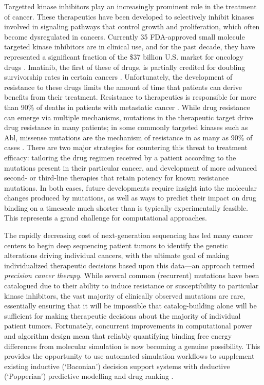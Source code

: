 Targetted kinase inhibitors play an increasingly prominent role in the treatment of cancer.
These therapeutics have been developed to selectively inhibit kinases involved in signaling pathways that control growth and proliferation, which often become dysregulated in cancers.
Currently 35 FDA-approved small molecule targeted kinase inhibitors are in clinical use, and for the past decade, they have represented a significant fraction of the \$37 billion U.S. market for oncology drugs \cite{FDA, Zhao2014}.
Imatinib, the first of these of drugs, is partially credited for doubling survivorship rates in certain cancers \cite{Zhao2014, ACSreport}.
Unfortunately, the development of resistance to these drugs limits the amount of time that patients can derive benefits from their treatment. 
Resistance to therapeutics is responsible for more than 90\% of deaths in patients with metastatic cancer \cite{Longley2005}. 
While drug resistance can emerge via multiple mechanisms, mutations in the therapeutic target drive drug resistance in many patients; in some commonly targeted kinases such as Abl, missense mutations are the mechanism of resistance in as many as 90\% of cases \cite{Shah2002}.
There are two major strategies for countering this threat to treatment efficacy: tailoring the drug regimen received by a patient according to the mutations present in their particular cancer, and development of more advanced second- or third-line therapies that retain potency for known resistance mutations.
In both cases, future developments require insight into the molecular changes produced by mutations, as well as ways to predict their impact on drug binding on a timescale much shorter than is typically experimentally feasible.
This represents a grand challenge for computational approaches.

The rapidly decreasing cost of next-generation sequencing has led many cancer centers to begin deep sequencing patient tumors to identify the genetic alterations driving individual cancers, with the ultimate goal of making individualized therapeutic decisions based upon this data—an approach termed \textit{precision cancer therapy}.
While several common (recurrent) mutations have been catalogued due to their ability to induce resistance or susceptibility to particular kinase inhibitors, the vast majority of clinically observed mutations are rare, essentially ensuring that it will be impossible that catalog-building alone will be sufficient for making therapeutic decisions about the majority of individual patient tumors.
Fortunately, concurrent improvements in computational power and algorithm design mean that reliably quantifying binding free energy differences from molecular simulation is now becoming a genuine possibility.
This provides the opportunity to use automated simulation workflows to supplement existing inductive (‘Baconian’) decision support systems with deductive (‘Popperian’) predictive modelling and drug ranking \cite{Marias2011, Sloot2009}.

